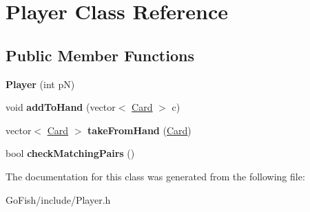 \hypertarget{class_player}{\section{Player Class Reference}
\label{class_player}
}
\subsection*{Public Member Functions}
\begin{DoxyCompactItemize}
\item 
\hypertarget{class_player_a80d1293f6f49b886db318f1dae7be23b}{{\bfseries Player} (int p\-N)}\label{class_player_a80d1293f6f49b886db318f1dae7be23b}

\item 
\hypertarget{class_player_ace93c12489cea500770591ccb47a2a0c}{void {\bfseries add\-To\-Hand} (vector$<$ \hyperlink{class_card}{Card} $>$ c)}\label{class_player_ace93c12489cea500770591ccb47a2a0c}

\item 
\hypertarget{class_player_ac713e9210395c367e796acc63d94dce7}{vector$<$ \hyperlink{class_card}{Card} $>$ {\bfseries take\-From\-Hand} (\hyperlink{class_card}{Card})}\label{class_player_ac713e9210395c367e796acc63d94dce7}

\item 
\hypertarget{class_player_adf635ce5997b0d4647a6f7d09b526dac}{bool {\bfseries check\-Matching\-Pairs} ()}\label{class_player_adf635ce5997b0d4647a6f7d09b526dac}

\end{DoxyCompactItemize}


The documentation for this class was generated from the following file\-:\begin{DoxyCompactItemize}
\item 
Go\-Fish/include/Player.\-h\end{DoxyCompactItemize}
